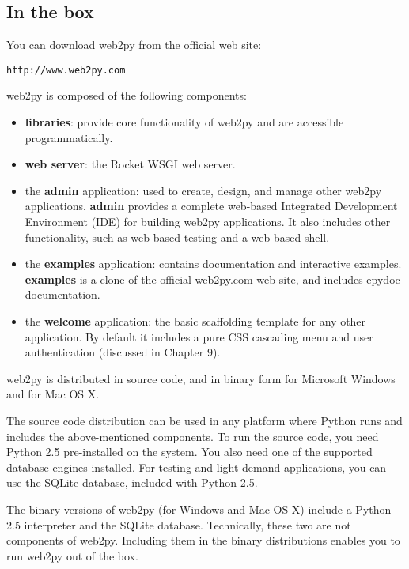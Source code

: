 \documentclass[justified,sixbynine,notoc]{tufte-book}
\begin{document}
\begin{fullwidth}
\goodbreak\section{In the box}

You can download web2py from the official web site:

\begin{lstlisting}[keywords={}]
http://www.web2py.com
\end{lstlisting}
\noindent web2py is composed of the following components:
\begin{itemize}
\item {\bf libraries}: provide core functionality of web2py and are accessible programmatically.

\item {\bf web server}: the Rocket WSGI web server.

\item the {\bf admin} application: used to create, design, and manage other web2py applications. {\bf admin} provides a complete web-based Integrated Development Environment (IDE) for building web2py applications. It also includes other functionality, such as web-based testing and a web-based shell.

\item the {\bf examples} application: contains documentation and interactive examples. {\bf examples} is a clone of the official web2py.com web site, and includes epydoc documentation.

\item the {\bf welcome} application: the basic scaffolding template for any other application. By default it includes a pure CSS cascading menu and user authentication (discussed in Chapter 9).
\end{itemize}
\noindent web2py is distributed in source code, and in binary form for Microsoft Windows and for Mac OS X.

The source code distribution can be used in any platform where Python runs and includes the above-mentioned components.
To run the source code, you need Python 2.5 pre-installed on the system. You also need one of the supported database engines installed.
For testing and light-demand applications, you can use the SQLite database, included with Python 2.5.

The binary versions of web2py (for Windows and Mac OS X) include a Python 2.5 interpreter and
the SQLite database. Technically, these two are not components of web2py. Including them in the binary distributions
enables you to run web2py out of the box.


\end{fullwidth}
\end{document}
